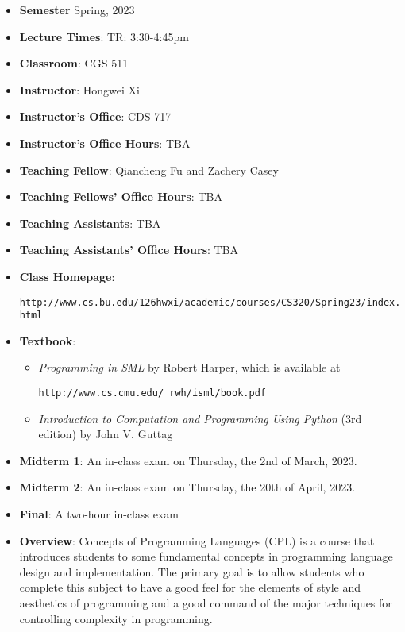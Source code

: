 \documentclass[11pt]{article}
\begin{document}
\begin{itemize}
\item {\bf Semester} Spring, 2023

\item {\bf Lecture Times}: TR: 3:30-4:45pm

\item {\bf Classroom}: CGS 511

\item {\bf Instructor}: Hongwei Xi
\item {\bf Instructor's Office}: CDS 717
\item {\bf Instructor's Office Hours}: TBA

\item {\bf Teaching Fellow}: Qiancheng Fu and Zachery Casey 
\item {\bf Teaching Fellows' Office Hours}: TBA

\item {\bf Teaching Assistants}: TBA
\item {\bf Teaching Assistants' Office Hours}: TBA

\item {\bf Class Homepage}:\\
\centerline{%
\texttt{http://www.cs.bu.edu/\char126hwxi/academic/courses/CS320/Spring23/index.html}%
}%

\item {\bf Textbook}:\kern6pt
\begin{itemize}
\item
{\em Programming in SML} by Robert Harper, which is available at
\begin{center}
\texttt{http://www.cs.cmu.edu/~rwh/isml/book.pdf}
\end{center}
\item
{\em Introduction to Computation and Programming Using Python} (3rd edition) by John V. Guttag
\end{itemize}

\item
{\bf Midterm 1}\kern6pt:
An in-class exam on Thursday, the 2nd of March, 2023.

\item
{\bf Midterm 2}\kern6pt:
An in-class exam on Thursday, the 20th of April, 2023.

\item {\bf Final}:\kern6pt A two-hour in-class exam

\item {\bf Overview}:
Concepts of Programming Languages (CPL) is a course that introduces
students to some fundamental concepts in programming language design and
implementation. The primary goal is to allow students who complete this
subject to have a good feel for the elements of style and aesthetics of
programming and a good command of the major techniques for controlling
complexity in programming.


\end{itemize}
\end{document}
